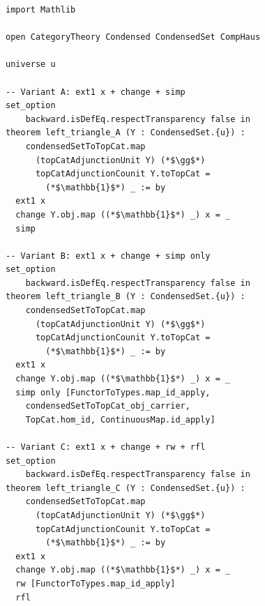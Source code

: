\documentclass[11pt]{article}
\theoremstyle{definition}
\theoremstyle{remark}
\begin{document}
\begin{lstlisting}
import Mathlib

open CategoryTheory Condensed CondensedSet CompHaus

universe u

-- Variant A: ext1 x + change + simp
set_option
    backward.isDefEq.respectTransparency false in
theorem left_triangle_A (Y : CondensedSet.{u}) :
    condensedSetToTopCat.map
      (topCatAdjunctionUnit Y) (*$\gg$*)
      topCatAdjunctionCounit Y.toTopCat =
        (*$\mathbb{1}$*) _ := by
  ext1 x
  change Y.obj.map ((*$\mathbb{1}$*) _) x = _
  simp

-- Variant B: ext1 x + change + simp only
set_option
    backward.isDefEq.respectTransparency false in
theorem left_triangle_B (Y : CondensedSet.{u}) :
    condensedSetToTopCat.map
      (topCatAdjunctionUnit Y) (*$\gg$*)
      topCatAdjunctionCounit Y.toTopCat =
        (*$\mathbb{1}$*) _ := by
  ext1 x
  change Y.obj.map ((*$\mathbb{1}$*) _) x = _
  simp only [FunctorToTypes.map_id_apply,
    condensedSetToTopCat_obj_carrier,
    TopCat.hom_id, ContinuousMap.id_apply]

-- Variant C: ext1 x + change + rw + rfl
set_option
    backward.isDefEq.respectTransparency false in
theorem left_triangle_C (Y : CondensedSet.{u}) :
    condensedSetToTopCat.map
      (topCatAdjunctionUnit Y) (*$\gg$*)
      topCatAdjunctionCounit Y.toTopCat =
        (*$\mathbb{1}$*) _ := by
  ext1 x
  change Y.obj.map ((*$\mathbb{1}$*) _) x = _
  rw [FunctorToTypes.map_id_apply]
  rfl
\end{lstlisting}
\end{document}
